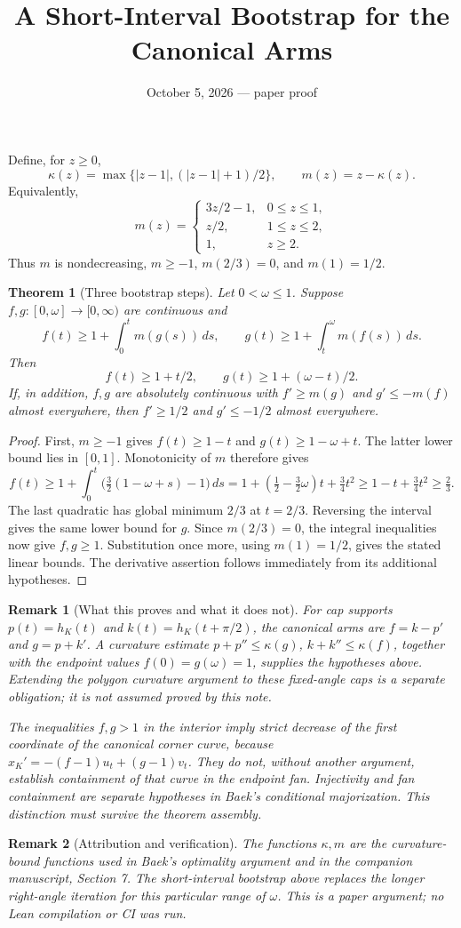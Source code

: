 \documentclass[11pt]{article}
\title{A Short-Interval Bootstrap for the Canonical Arms}
\author{}\date{October 5, 2026 --- paper proof}
\newtheorem{theorem}{Theorem}
\newtheorem{remark}{Remark}
\begin{document}
\maketitle
Define, for $z\ge0$,
\[
 \kappa(z)=\max\{|z-1|,(|z-1|+1)/2\},\qquad m(z)=z-\kappa(z).
\]
Equivalently,
\[
 m(z)=\begin{cases}3z/2-1,&0\le z\le1,\\z/2,&1\le z\le2,\\1,&z\ge2.\end{cases}
\]
Thus $m$ is nondecreasing, $m\ge-1$, $m(2/3)=0$, and $m(1)=1/2$.

\begin{theorem}[Three bootstrap steps]
Let $0<\omega\le1$. Suppose $f,g:[0,\omega]\to[0,\infty)$ are continuous and
\[
 f(t)\ge1+\int_0^t m(g(s))\,ds,\qquad
 g(t)\ge1+\int_t^\omega m(f(s))\,ds.
\]
Then
\[
 f(t)\ge1+t/2,\qquad g(t)\ge1+(\omega-t)/2.
\]
If, in addition, $f,g$ are absolutely continuous with
$f'\ge m(g)$ and $g'\le-m(f)$ almost everywhere, then
$f'\ge1/2$ and $g'\le-1/2$ almost everywhere.
\end{theorem}
\begin{proof}
First, $m\ge-1$ gives $f(t)\ge1-t$ and $g(t)\ge1-\omega+t$. The latter lower bound lies in $[0,1]$. Monotonicity of $m$ therefore gives
\[
 f(t)\ge1+\int_0^t\bigl(\tfrac32(1-\omega+s)-1\bigr)\,ds
 =1+(\tfrac12-\tfrac32\omega)t+\tfrac34t^2
 \ge1-t+\tfrac34t^2\ge\tfrac23.
\]
The last quadratic has global minimum $2/3$ at $t=2/3$. Reversing the interval gives the same lower bound for $g$. Since $m(2/3)=0$, the integral inequalities now give $f,g\ge1$. Substitution once more, using $m(1)=1/2$, gives the stated linear bounds. The derivative assertion follows immediately from its additional hypotheses.
\end{proof}

\begin{remark}[What this proves and what it does not]
For cap supports $p(t)=h_K(t)$ and $k(t)=h_K(t+\pi/2)$, the canonical arms are $f=k-p'$ and $g=p+k'$. A curvature estimate $p+p''\le\kappa(g)$, $k+k''\le\kappa(f)$, together with the endpoint values $f(0)=g(\omega)=1$, supplies the hypotheses above. Extending the polygon curvature argument to these fixed-angle caps is a separate obligation; it is not assumed proved by this note.

The inequalities $f,g>1$ in the interior imply strict decrease of the first coordinate of the canonical corner curve, because $x_K'=-(f-1)u_t+(g-1)v_t$. They do not, without another argument, establish containment of that curve in the endpoint fan. Injectivity and fan containment are separate hypotheses in Baek's conditional majorization. This distinction must survive the theorem assembly.
\end{remark}

\begin{remark}[Attribution and verification]
The functions $\kappa,m$ are the curvature-bound functions used in Baek's optimality argument and in the companion manuscript, Section 7. The short-interval bootstrap above replaces the longer right-angle iteration for this particular range of $\omega$. This is a paper argument; no Lean compilation or CI was run.
\end{remark}
\end{document}
